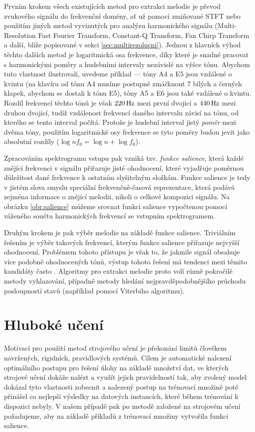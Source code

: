 Prvním krokem všech existujících metod pro extrakci melodie je převod zvukového signálu do frekvenční domény, ať už pomocí zmiňované STFT nebo použitím jiných metod vyvinutých pro analýzu harmonického signálu (Multi-Resolution Fast Fourier Transform, Constant-Q Transform, Fan Chirp Transform a další, blíže popisované v sekci \ref{sec:multirezolucni}). Jednou z hlavních výhod těchto dalších metod je logaritmická osa frekvence, díky které je snadné pracovat s harmonickými poměry a hudebními intervaly nezávislé na výšce tónu. Abychom tuto vlastnost ilustrovali, uvedeme příklad --- tóny A4 a E5 jsou vzdálené o kvintu (na klavíru od tónu A4 musíme postupně zmáčknout 7 bílých a černých klapek, abychom se dostali k tónu E5), tóny A5 a E6 jsou také vzdálené o kvintu. Rozdíl frekvencí těchto tónů je však $220\,\rm Hz$ mezi první dvojicí a $440\,\rm Hz$ mezi druhou dvojicí, tudíž vzdálenost frekvencí daného intervalu závisí na tónu, od kterého se tento interval počítá. Protože je hudební interval jistý \emph{poměr} mezi dvěma tóny, použitím logaritmické osy frekvence se tyto poměry budou jevit jako absolutní rozdíly ($\log n f_0 = \log n + \log f_0$). 

Zpracováním spektrogramu vstupu pak vzniká tzv. \emph{funkce salience}, která každé znějící frekvenci v signálu přiřazuje jisté ohodnocení, které vyjadřuje poměrnou důležitost dané frekvence k ostatním slyšitelným složkám. Funkce salience je tedy v jistém slova smyslu speciální frekvenčně-časová reprezentace, která podává zejména informace o znějící melodii, nikoli o celkové kompozici signálu. Na obrázku \ref{obr:salience} můžeme srovnat funkci salience vypočtenou pomocí váženého součtu harmonických frekvencí se vstupním spektrogramem.

Druhým krokem je pak výběr melodie na základě funkce salience. Triviálním řešením je výběr takových frekvencí, kterým funkce salience přiřazuje nejvyšší ohodnocení. Problémem tohoto přístupu je však to, že jakmile signál obsahuje více podobně ohodnocených tónů, výstup tohoto řešení má tendenci mezi těmito kandidáty často . Algoritmy pro extrakci melodie proto volí různě pokročilé metody vyhlazování, případně metody hledání nejpravděpodobnějšího průchodu posloupností stavů (například pomocí Viterbiho algoritmu).

\section{Hluboké učení}

Motivací pro použití metod strojového učení je překonání limitů člověkem navržených, rigidních, pravidlových systémů. Cílem je automatické nalezení optimálního postupu pro řešení úlohy na základě množství dat, ve kterých strojové učení dokáže nalézt a využít jejich pravidelností tak, aby zvolený model dokázal tyto vlastnosti zobecnit a nalezený postup na trénovací množině poté přinášel co nejlepší výsledky na datových instancích, které během trénování k dispozici nebyly. V našem případě pak po metodě založené na strojovém učení požadujeme, aby na základě příkladů z trénovací množiny vytvořila funkci salience.


